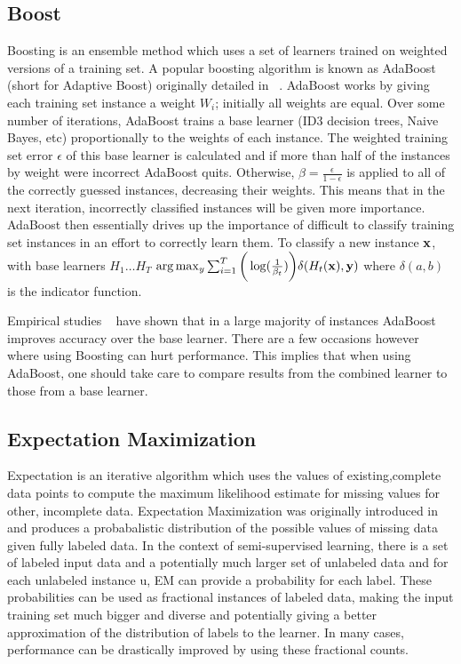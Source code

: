 \documentclass{sig-alternate}
\begin{document}
\subsection{Boost}
Boosting is an ensemble method which uses a set of learners trained on weighted versions of a training set. A popular boosting algorithm is known as AdaBoost (short for Adaptive Boost) originally detailed in ~\cite{Freund:1997:DGO:261540.261549}.  AdaBoost works by giving each training set instance a weight $W_{i}$; initially all weights are equal. Over some number of iterations, AdaBoost trains a base learner (ID3 decision trees, Naive Bayes, etc) proportionally to the weights of each instance. The weighted training set error $\epsilon$ of this base learner is calculated and if more than half of the instances by weight were incorrect AdaBoost quits.  Otherwise, $\beta=\frac{\epsilon}{1-\epsilon}$ is applied to all of the correctly guessed instances, decreasing their weights.  This means that in the next iteration, incorrectly classified instances will be given more importance.  AdaBoost then essentially drives up the importance of difficult to classify training set instances in an effort to correctly learn them.  To classify a new instance $\bf{x}$, with base learners $H_{1} \dots H_{T}$  $\arg \max_{y} \sum_{i=1}^{T}\bigg(\log(\frac{1}{\beta_{t}})\bigg) \delta(H_{t}(\bf{x}),y)$ where $\delta(a,b)$ is the indicator function.
 

Empirical studies ~\cite{dietterich1997machine} have shown that in a large majority of instances AdaBoost improves accuracy over the base learner.  There are a few occasions however where using Boosting can hurt performance.  This implies that when using AdaBoost, one should take care to compare results from the combined learner to those from a base learner.

\subsection{Expectation Maximization}
Expectation is an iterative algorithm which uses the values of existing,complete data points to compute the maximum likelihood estimate for missing values for other, incomplete data. Expectation Maximization was originally introduced in ~\cite{Dempster77maximumlikelihood} and produces a probabalistic distribution of the possible values of missing data given fully labeled data. In the context of semi-supervised learning, there is a set of labeled input data and a potentially much larger set of unlabeled data and for each unlabeled instance u, EM can provide a probability for each label.  These probabilities can be used as fractional instances of labeled data, making the input training set much bigger and diverse and potentially giving a better approximation of the distribution of labels to the learner. In many cases, performance can be drastically improved by using these fractional counts.
\end{document}
